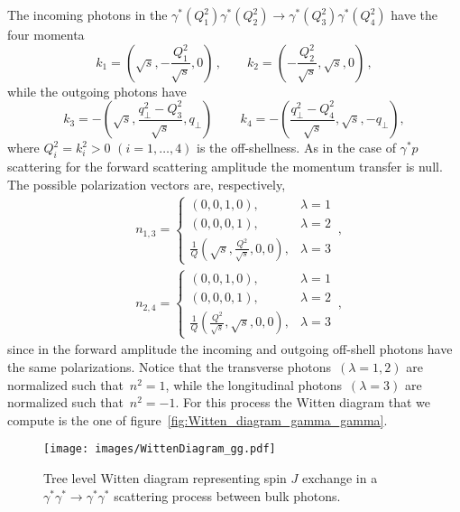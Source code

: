 \documentclass[a4paper,12pt]{article}
\begin{document}
The incoming photons in the $\gamma^{*}\left(Q_1^2\right) \gamma^{*}\left(Q_2^2\right) \rightarrow \gamma^{*}\left(Q_3^2\right) \gamma^{*}\left(Q_4^2\right)$  have the four momenta
\begin{equation} 
k_1 = \left( \sqrt{s}, - \frac{Q_1^2}{\sqrt{s}}, 0 \right) \,,  \qquad  
k_2 = \left( - \frac{Q_2^2}{\sqrt{s}}, \sqrt{s},  0 \right) \,,
\end{equation}
while the outgoing photons have
\begin{equation}
k_3 = - \left( \sqrt{s},  \frac{q_\perp^2 - Q_3^2}{\sqrt{s}}, q_\perp \right) \, \qquad  k_4 = - \left(  \frac{q_\perp^2-Q_4^2}{\sqrt{s}}, \sqrt{s},  -q_\perp \right),
\end{equation}
where $Q^2_i = k_i^2 >0$  $(i=1, \dots, 4)$ is the off-shellness. As in the case of $\gamma^* p$ scattering for the forward scattering amplitude the 
momentum transfer is null.
The possible polarization vectors are, respectively,
\begin{align}
    &n_{1,3} =
    \begin{cases}
      \left(0,0,1,0\right), & \lambda=1 \\
      \left(0,0,0,1\right), & \lambda=2 \\
      \frac{1}{Q} \left( \sqrt{s}, \frac{Q^2}{\sqrt{s}}, 0, 0 \right), & \lambda = 3
    \end{cases}\,,\\
    &n_{2,4} =
    \begin{cases}
      \left(0,0,1,0\right), & \lambda=1 \\
      \left(0,0,0,1\right), & \lambda=2 \\
      \frac{1}{Q} \left( \frac{Q^2}{\sqrt{s}}, \sqrt{s}, 0, 0 \right), & \lambda = 3
    \end{cases} \,,
    \label{eq:inPolarization}
\end{align}
since in the forward amplitude the incoming and outgoing off-shell photons have the same polarizations.
Notice that the transverse photons~$\left(\lambda=1,2\right)$ are normalized such that~$n^2 = 1$, while the longitudinal photons~$\left(\lambda=3\right)$ are normalized such that~$n^2 = -1$.
For this process the Witten diagram that we compute is the one of figure~\ref{fig:Witten_diagram_gamma_gamma}.
\begin{figure}[!h]
  \center
  \texttt{[image: images/WittenDiagram\_gg.pdf]} 
  \caption{Tree level Witten diagram representing spin $J$    exchange in a $\gamma^* \gamma^* \to \gamma^* \gamma^*$ scattering process between bulk photons.}
  \label{fig:Witten_diagram_gg}
\end{figure}
\end{document}
